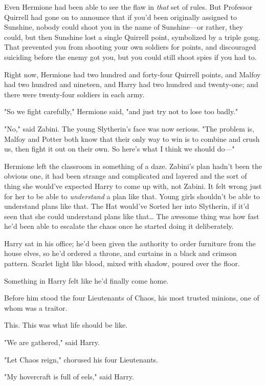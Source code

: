 Even Hermione had been able to see the flaw in \emph{that} set of rules. But
Professor Quirrell had gone on to announce that if you'd been originally
assigned to Sunshine, nobody could shoot you in the name of Sunshine---or
rather, they could, but then Sunshine lost a single Quirrell point, symbolized
by a triple gong. That prevented you from shooting your own soldiers for
points, and discouraged suiciding before the enemy got you, but you could still
shoot spies if you had to.

Right now, Hermione had two hundred and forty-four Quirrell points, and Malfoy
had two hundred and nineteen, and Harry had two hundred and twenty-one; and
there were twenty-four soldiers in each army.

"So we fight carefully," Hermione said, "and just try not to lose too badly."

"No," said Zabini. The young Slytherin's face was now serious. "The problem is,
Malfoy and Potter both know that their only way to win is to combine and crush
us, then fight it out on their own. So here's what I think we should do---"

Hermione left the classroom in something of a daze. Zabini's plan hadn't been
the obvious one, it had been strange and complicated and layered and the sort
of thing she would've expected Harry to come up with, not Zabini. It felt wrong
just for her to be able to \emph{understand} a plan like that. Young girls
shouldn't be able to understand plans like that. The Hat would've Sorted her
into Slytherin, if it'd seen that she could understand plans like that{\ldots}
\later
The awesome thing was how fast he'd been able to escalate the chaos once he
started doing it deliberately.

Harry sat in his office; he'd been given the authority to order furniture from
the house elves, so he'd ordered a throne, and curtains in a black and crimson
pattern. Scarlet light like blood, mixed with shadow, poured over the floor.

Something in Harry felt like he'd finally come home.

Before him stood the four Lieutenants of Chaos, his most trusted minions, one
of whom was a traitor.

This. This was what life should be like.

"We are gathered," said Harry.

"Let Chaos reign," chorused his four Lieutenants.

"My hovercraft is full of eels," said Harry.

